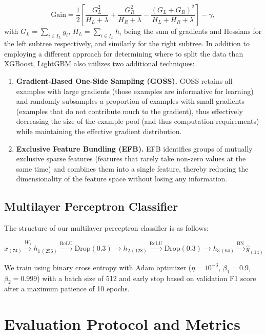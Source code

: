 \begin{equation}
\mathrm{Gain}=\frac{1}{2}\left[\frac{G_L^2}{H_L+\lambda}+\frac{G_R^2}{H_R+\lambda}-\frac{(G_L+G_R)^2}{H_L+H_R+\lambda}\right]-\gamma,
\label{eq:lgbm_gain}
\end{equation}
with $G_L=\sum_{i\in I_L}g_i$, $H_L=\sum_{i\in I_L}h_i$ being the sum of gradients and Hessians for the left subtree respectively, and similarly for the right subtree. In addition to employing a different approach for determining where to split the data than XGBoost, LightGBM also utilizes two additional techniques:
\begin{enumerate}[topsep=0pt,leftmargin=*]
\item \textbf{Gradient-Based One-Side Sampling (GOSS).} GOSS retains all examples with large gradients (those examples are informative for learning) and randomly subsamples a proportion of examples with small gradients (examples that do not contribute much to the gradient), thus effectively decreasing the size of the example pool (and thus computation requirements) while maintaining the effective gradient distribution.
\item \textbf{Exclusive Feature Bundling (EFB).} EFB identifies groups of mutually exclusive sparse features (features that rarely take non-zero values at the same time) and combines them into a single feature, thereby reducing the dimensionality of the feature space without losing any information.
\end{enumerate}

\subsection{Multilayer Perceptron Classifier}

The structure of our multilayer perceptron classifier is as follows:

$$ x_{(74)} \xrightarrow{W_1} h_{1\,(256)} \xrightarrow{\mathrm{ReLU}} \mathrm{Drop}(0.3) \to h_{2\,(128)} \xrightarrow{\mathrm{ReLU}} \mathrm{Drop}(0.3) \to h_{3\,(64)} \xrightarrow{\mathrm{BN}} \hat{y}_{(14)} $$

We train using binary cross entropy with Adam optimizer ($\eta = 10^{-3}$, $\beta_1 = 0.9$, $\beta_2 = 0.999$) with a batch size of 512 and early stop based on validation F1 score after a maximum patience of 10 epochs.

\section{Evaluation Protocol and Metrics}

